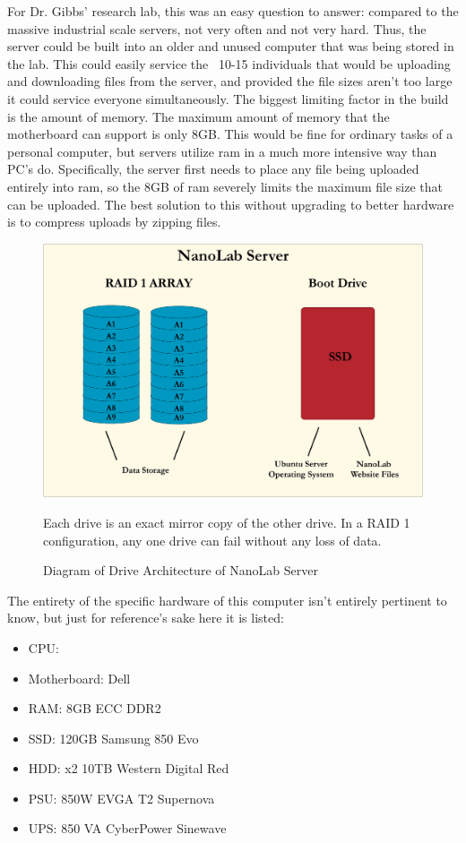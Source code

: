 \documentclass[titlepage]{article}
\begin{document}
    For Dr. Gibbs' research lab, this was an easy question to answer: compared to the massive industrial scale servers, not very often and not very hard. Thus, the server could be built into an older and unused computer that was being stored in the lab. This could easily service the ~10-15 individuals that would be uploading and downloading files from the server, and provided the file sizes aren't too large it could service everyone simultaneously. The biggest limiting factor in the build is the amount of memory. The maximum amount of memory that the motherboard can support is only 8GB. This would be fine for ordinary tasks of a personal computer, but servers utilize ram in a much more intensive way than PC's do. Specifically, the server first needs to place any file being uploaded entirely into ram, so the 8GB of ram severely limits the maximum file size that can be uploaded. The best solution to this without upgrading to better hardware is to compress uploads by zipping files.
    
    \begin{figure}[t]
    \centering
    \includegraphics[width=120mm]{Architecture.png}
     \caption{Diagram of Drive Architecture of NanoLab Server}
     \medskip
     \small 
     Each drive is an exact mirror copy of the other drive. In a RAID 1 configuration, any one drive can fail without any loss of data.
     \label{Architecture}
    \end{figure}
    
    The entirety of the specific hardware of this computer isn't entirely pertinent to know, but just for reference's sake here it is listed:
    
    \begin{itemize}
    \item CPU: 
    \item Motherboard: Dell
    \item RAM: 8GB ECC DDR2
    \item SSD: 120GB Samsung 850 Evo
    \item HDD: x2 10TB Western Digital Red
    \item PSU: 850W EVGA T2 Supernova
    \item UPS: 850 VA CyberPower Sinewave
    \end{itemize}
\end{document}
